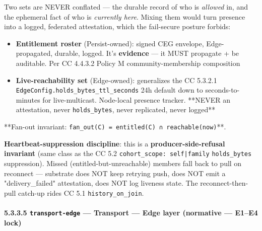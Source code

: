 \documentclass[11pt]{article}
\begin{document}
Two sets are NEVER conflated — the durable record of who is \textit{allowed} in, and the ephemeral fact of who is \textit{currently here}. Mixing them would turn presence into a logged, federated attestation, which the fail-secure posture forbids:


\begin{itemize}\setlength\itemsep{0pt}
\item \textbf{Entitlement roster} (Persist-owned): signed CEG envelope, Edge-propagated, durable, logged. It's \textbf{evidence} — it MUST propagate + be auditable. Per CC 4.4.3.2 Policy M community-membership composition
\item \textbf{Live-reachability set} (Edge-owned): generalizes the CC 5.3.2.1 \texttt{EdgeConfig.holds\_bytes\_ttl\_seconds} 24h default down to seconds-to-minutes for live-multicast. Node-local presence tracker. **NEVER an attestation, never \texttt{holds\_bytes}, never replicated, never logged**
\end{itemize}


**Fan-out invariant: \texttt{fan\_out(C) = entitled(C) ∩ reachable(now)}**.


\textbf{Heartbeat-suppression discipline}: this is a \textbf{producer-side-refusal invariant} (same class as the CC 5.2 \texttt{cohort\_scope: self|family} \texttt{holds\_bytes} suppression). Missed (entitled-but-unreachable) members fall back to pull on reconnect — substrate does NOT keep retrying push, does NOT emit a "delivery\_failed" attestation, does NOT log liveness state. The reconnect-then-pull catch-up rides CC 5.1 \texttt{history\_on\_join}.


\paragraph{5.3.3.5 \texttt{transport-edge} — Transport — Edge layer (normative — E1–E4 lock)}\mbox{}\\
\end{document}
